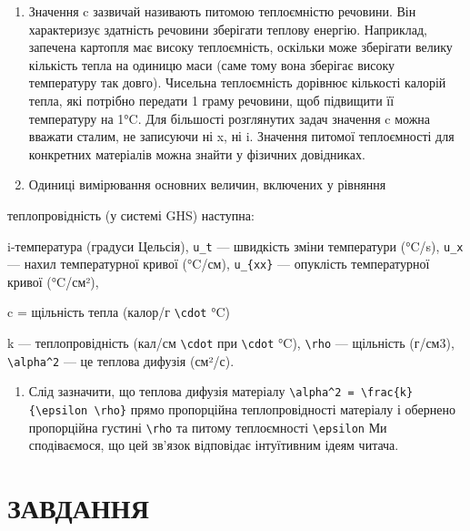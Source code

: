 \documentclass[
  ukrainian,
]{article}
\providecommand{\tightlist}{%
  \setlength{\itemsep}{0pt}\setlength{\parskip}{0pt}}
\begin{document}
\begin{enumerate}
\def\labelenumi{\arabic{enumi}.}
\setcounter{enumi}{1}
\item
  Значення c зазвичай називають питомою теплоємністю речовини. Він
  характеризує здатність речовини зберігати теплову енергію. Наприклад,
  запечена картопля має високу теплоємність, оскільки може зберігати
  велику кількість тепла на одиницю маси (саме тому вона зберігає високу
  температуру так довго). Чисельна теплоємність дорівнює кількості
  калорій тепла, які потрібно передати 1 граму речовини, щоб підвищити
  її температуру на 1°C. Для більшості розглянутих задач значення c
  можна вважати сталим, не записуючи ні x, ні i. Значення питомої
  теплоємності для конкретних матеріалів можна знайти у фізичних
  довідниках.
\item
  Одиниці вимірювання основних величин, включених у рівняння
\end{enumerate}

теплопровідність (у системі GHS) наступна:

i-температура (градуси Цельсія), \texttt{u\_t} --- швидкість зміни
температури (°C/s), \texttt{u\_x} --- нахил температурної кривої
(°C/см), \texttt{u\_\{xx\}} --- опуклість температурної кривої (°C/см²),

c = щільність тепла (калор/г \texttt{\textbackslash{}cdot} °C)

k --- теплопровідність (кал/см \texttt{\textbackslash{}cdot} при
\texttt{\textbackslash{}cdot} °C), \texttt{\textbackslash{}rho} ---
щільність (г/см3), \texttt{\textbackslash{}alpha\^{}2} --- це теплова
дифузія (см²/с).

\begin{enumerate}
\def\labelenumi{\arabic{enumi}.}
\setcounter{enumi}{3}
\tightlist
\item
  Слід зазначити, що теплова дифузія матеріалу
  \texttt{\textbackslash{}alpha\^{}2\ =\ \textbackslash{}frac\{k\}\{\textbackslash{}epsilon\ \textbackslash{}rho\}}
  прямо пропорційна теплопровідності матеріалу і обернено пропорційна
  густині \texttt{\textbackslash{}rho} та питому теплоємності
  \texttt{\textbackslash{}epsilon} Ми сподіваємося, що цей зв'язок
  відповідає інтуїтивним ідеям читача.
\end{enumerate}

\section{ЗАВДАННЯ}\label{ux437ux430ux432ux434ux430ux43dux43dux44f-1}
\end{document}
